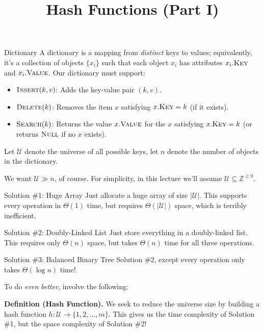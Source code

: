 \title{Hash Functions (Part I)}



\begin{problem}{Dictionary}
    A dictionary is a mapping from \emph{distinct} keys to values; equivalently, it's a collection of objects $\{x_i\}$ such that each object $x_i$ has attributes $x_i.\textsc{Key}$ and $x_i.\textsc{Value}$.  Our dictionary must support:
    \begin{itemize}
        \item $\textsc{Insert}(k, v)$: Adds the key-value pair $(k, v)$.
        \item $\textsc{Delete}(k)$: Removes the item $x$ satisfying $x.\textsc{Key} = k$ (if it exists).
        \item $\textsc{Search}(k)$: Returns the value $x.\textsc{Value}$ for the $x$ satisfying $x.\textsc{Key} = k$ (or returns $\textsc{Null}$ if no $x$ exists).
    \end{itemize}
\end{problem}
Let $\mathcal{U}$ denote the universe of all possible keys, let $n$ denote the number of objects in the dictionary.

We want $\mathcal{U} \gg n$, of course.  For simplicity, in this lecture we'll assume $\mathcal{U} \subseteq \mathbb{Z}^{\geq 0}$.

\begin{solution}{Solution \#1: Huge Array}
    Just allocate a huge array of size $|\mathcal{U}|$.  This supports every operation in $\Theta(1)$ time, but requires $\Theta(|\mathcal{U}|)$ space, which is terribly inefficient.
\end{solution}

\begin{solution}{Solution \#2: Doubly-Linked List}
    Just store everything in a doubly-linked list.  This requires only $\Theta(n)$ space, but takes $\Theta(n)$ time for all three operations.
\end{solution}

\begin{solution}{Solution \#3: Balanced Binary Tree}
    Solution \#2, except every operation only takes $\Theta(\log n)$ time!
\end{solution}

To do \emph{even better}, involve the following:

\textbf{Definition (Hash Function).} We seek to reduce the universe size by building a hash function $h: \mathcal{U} \to \{1, 2, \dots, m\}$.  This gives us the time complexity of Solution \#1, but the space complexity of Solution \#2!

